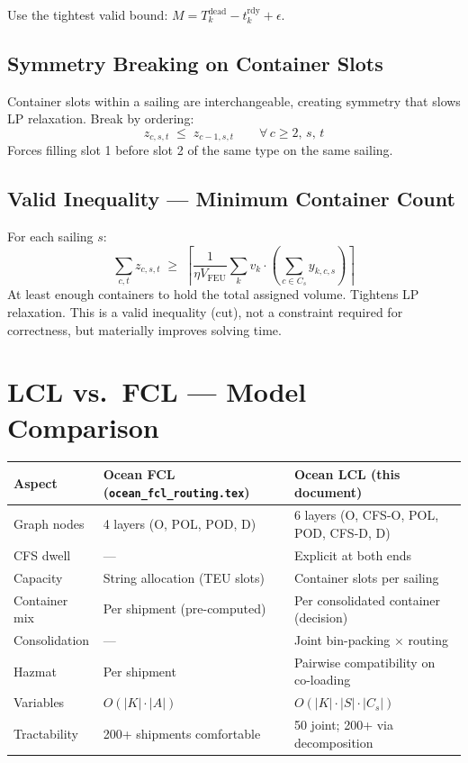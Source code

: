\documentclass[11pt,a4paper]{article}
\newcommand{\ceil}[1]{\left\lceil #1 \right\rceil}
\theoremstyle{definition}
\begin{document}
Use the tightest valid bound: $M = T_k^{\text{dead}} - t_k^{\text{rdy}} + \epsilon$.

\subsection{Symmetry Breaking on Container Slots}

Container slots within a sailing are interchangeable, creating symmetry that slows LP relaxation.
Break by ordering:
\begin{equation}
  z_{c,s,t} \;\leq\; z_{c-1,s,t} \qquad \forall\, c \geq 2,\, s,\, t
  \label{eq:symmetry}
\end{equation}
Forces filling slot 1 before slot 2 of the same type on the same sailing.

\subsection{Valid Inequality — Minimum Container Count}

For each sailing $s$:
\begin{equation}
  \sum_{c, t} z_{c,s,t} \;\geq\; \ceil{\frac{1}{\eta V_{\text{FEU}}} \sum_{k} v_k \cdot \left(\sum_{c \in C_s} y_{k,c,s}\right)}
\end{equation}
At least enough containers to hold the total assigned volume. Tightens LP relaxation. This is
a valid inequality (cut), not a constraint required for correctness, but materially improves
solving time.

\section{LCL vs.\ FCL — Model Comparison}

\begin{center}
\begin{tabular}{lll}
\toprule
Aspect & Ocean FCL (\texttt{ocean\_fcl\_routing.tex}) & Ocean LCL (this document) \\
\midrule
Graph nodes & 4 layers (O, POL, POD, D) & 6 layers (O, CFS-O, POL, POD, CFS-D, D) \\
CFS dwell & — & Explicit at both ends \\
Capacity & String allocation (TEU slots) & Container slots per sailing \\
Container mix & Per shipment (pre-computed) & Per consolidated container (decision) \\
Consolidation & — & Joint bin-packing $\times$ routing \\
Hazmat & Per shipment & Pairwise compatibility on co-loading \\
Variables & $O(|K| \cdot |A|)$ & $O(|K| \cdot |S| \cdot |C_s|)$ \\
Tractability & 200+ shipments comfortable & 50 joint; 200+ via decomposition \\
\bottomrule
\end{tabular}
\end{center}
\end{document}
